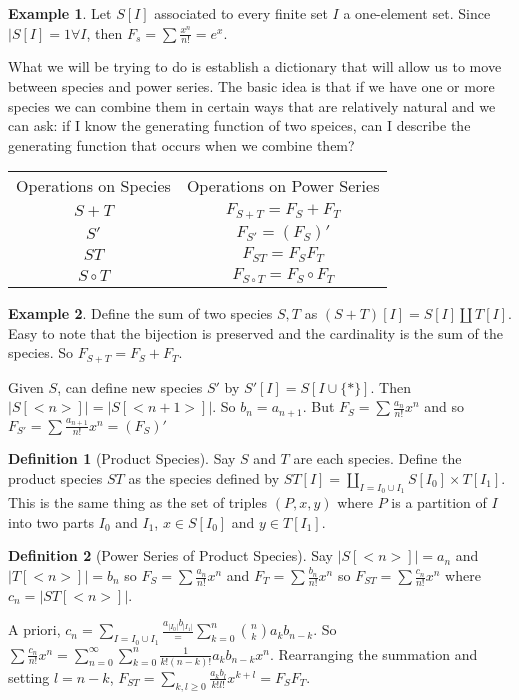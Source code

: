 \documentclass[12pt]{article}
\theoremstyle{definition}
\newtheorem{defn}{Definition}
\newtheorem{exmp}{Example}[section]
\begin{document}
\begin{exmp}
    Let $S[I]$ associated to every finite set $I$ a one-element set. Since
    $|S[I] = 1 \forall I$, then $F_s = \sum \frac{x^n}{n!} = e^x$.
\end{exmp}

What we will be trying to do is establish a dictionary that will allow us to
move between species and power series. The basic idea is that if we have one or
more species we can combine them in certain ways that are relatively natural
and we can ask: if I know the generating function of two speices, can I
describe the generating function that occurs when we combine them?

\begin{center}
\begin{tabular}{ c c }
    Operations on Species & Operations on Power Series\\ 
    $S + T$ & $F_{S + T} = F_S + F_T$ \\ 
    $S'$ & $F_{S'} = (F_S)'$ \\
    $ST$ & $F_{ST} = F_SF_T$ \\
    $S \circ T$ & $F_{S \circ T} = F_S \circ F_T$
\end{tabular}
\end{center}

\begin{exmp}
    Define the sum of two species $S, T$ as $(S + T)[I] = S[I] \coprod T[I]$.
    Easy to note that the bijection is preserved and the cardinality is the sum
    of the species. So $F_{S + T} = F_S + F_T$.
\end{exmp}

Given $S$, can define new species $S'$ by $S'[I] = S[I\cup \{*\}]$. Then
$|S[<n>]| = |S[<n + 1>]|$.  So $b_n = a_{n + 1}$. But $F_S = \sum
\frac{a_n}{n!}x^n$ and so $F_{S'} = \sum \frac{a_{n+1}}{n!} x^n = (F_S)'$ 

\begin{defn}[Product Species]
    Say $S$ and $T$ are each species. Define the product species $ST$ as the
    species defined by $ST[I] = \coprod_{I = I_0 \cup I_1} S[I_0] \times
    T[I_1]$.  This is the same thing as the set of triples $(P, x, y)$ where
    $P$ is a partition of $I$ into two parts $I_0$ and $I_1$, $x \in S[I_0]$
    and $y \in T[I_1]$.
\end{defn}

\begin{defn}[Power Series of Product Species]
    Say $|S[<n>]| = a_n$ and $|T[<n>]| = b_n$ so $F_S = \sum \frac{a_n}{n!}x^n$
    and $F_T = \sum \frac{b_n}{n!} x^n$ so $F_{ST} = \sum \frac{c_n}{n!}x^n$
    where $c_n = |ST[<n>]|$.

    A priori, $c_n = \sum_{I = I_0 \cup I_1} \frac{a_{|I_0|}b_{|I_1|}} =
    \sum_{k=0}^n {n \choose k}a_k b_{n-k}$. So $\sum \frac{c_n}{n!} x^n =
    \sum_{n=0}^\infty \sum_{k=0}^n \frac{1}{k!(n-k)!} a_kb_{n-k}x^n$.
    Rearranging the summation and setting $l = n-k$, $F_{ST} = \sum_{k, l \ge
    0} \frac{a_kb_l}{k!l!} x^{k+l} = F_SF_T$.
\end{defn}
\end{document}
